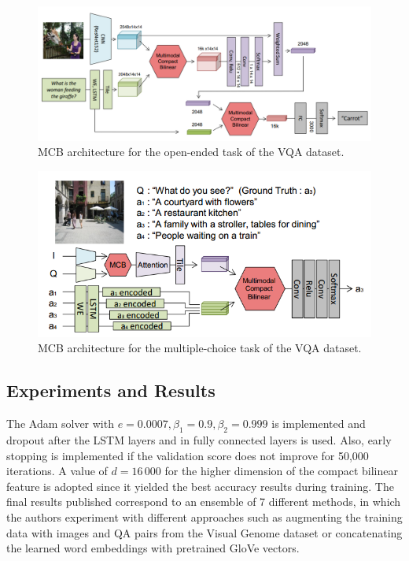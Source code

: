 \documentclass{article}
\begin{document}
    \begin{figure}[ht]
    	\centering
            \includegraphics[width=1.0\linewidth]{mcbArch.PNG}
    	\caption{MCB architecture for the open-ended task of the VQA dataset.}
    	\label{mcbArch}
    \end{figure}
    \begin{figure}[ht]
    	\centering
            \includegraphics[width=0.75\linewidth]{mcbArch+ans.PNG}
        \caption{MCB architecture for the multiple-choice task of the VQA dataset.}
    	\label{mcbArch+ans}
    \end{figure}

\subsection{Experiments and Results}
The Adam solver with $e=0.0007, \beta_1=0.9, \beta_2=0.999$ is implemented and dropout after the LSTM layers and in fully connected layers is used. Also, early stopping is implemented if the validation score does not improve for 50,000 iterations. A value of $d = 16\,000$ for the higher dimension of the compact bilinear feature is adopted since it yielded the best accuracy results during training. The final results published correspond to an ensemble of 7 different methods, in which the authors experiment with different approaches such as augmenting the training data with images and QA pairs from the Visual Genome dataset or concatenating the learned word embeddings with pretrained GloVe vectors.
\end{document}
